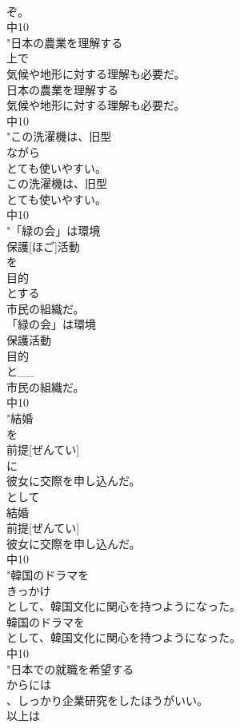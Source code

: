 \documentclass[8pt]{extreport}
\begin{document}
\begin{CJK}{UTF8}{min}
\\	ぞ。
\\	中10
\\	"日本の農業を理解する
\\	上で
\\	気候や地形に対する理解も必要だ。
\\	日本の農業を理解する
\\	気候や地形に対する理解も必要だ。
\\	中10
\\	"この洗濯機は、旧型
\\	ながら
\\	とても使いやすい。
\\	この洗濯機は、旧型
\\	とても使いやすい。
\\	中10
\\	"「緑の会」は環境
\\	保護[ほご]活動
\\	を
\\	目的
\\	とする
\\	市民の組織だ。
\\	「緑の会」は環境
\\	保護活動
\\	目的
\\	と__
\\	市民の組織だ。
\\	中10
\\	"結婚
\\	を
\\	前提[ぜんてい]
\\	に
\\	彼女に交際を申し込んだ。
\\	として
\\	結婚
\\	前提[ぜんてい]
\\	彼女に交際を申し込んだ。
\\	中10
\\	"韓国のドラマを
\\	きっかけ
\\	として、韓国文化に関心を持つようになった。
\\	韓国のドラマを
\\	として、韓国文化に関心を持つようになった。
\\	中10
\\	"日本での就職を希望する
\\	からには
\\	、しっかり企業研究をしたほうがいい。
\\	以上は

\end{CJK}
\end{document}
